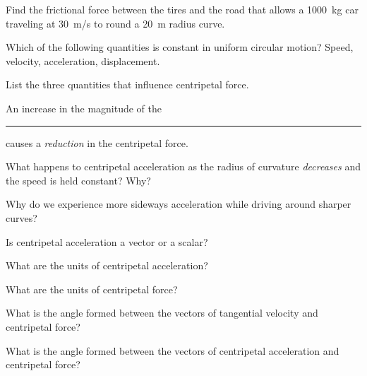 \documentclass[main-physics.tex]{subfiles}
\begin{document}
\begin{exercise} \label{MJm5VE}
    Find the frictional force between the tires and the road that allows a \SI{1000}{kg} car traveling at \SI{30}{m/s} to round a \SI{20}{m} radius curve.
\end{exercise}

\begin{exercise} \label{fsjtBV}
    Which of the following quantities is constant in uniform circular motion? Speed, velocity, acceleration, displacement.
\end{exercise}

\begin{exercise} \label{GD8Yff}
    List the three quantities that influence centripetal force.
\end{exercise}

\begin{exercise} \label{aEtlVz}
    An increase in the magnitude of the \rule{2cm}{0.15mm} causes a \textit{reduction} in the centripetal force.
\end{exercise}

\begin{exercise} \label{5lauZ6}
    What happens to centripetal acceleration as the radius of curvature \textit{decreases} and the speed is held constant? Why?
\end{exercise}

\begin{exercise} \label{KB7t4k}
    Why do we experience more sideways acceleration while driving around sharper curves?
\end{exercise}

\begin{exercise} \label{jb3iGO}
    Is centripetal acceleration a vector or a scalar?
\end{exercise}

\begin{exercise} \label{TUxTQh}
    What are the units of centripetal acceleration?
\end{exercise}

\begin{exercise} \label{9YKhPo}
    What are the units of centripetal force?
\end{exercise}

\begin{exercise} \label{wS6Htw}
    What is the angle formed between the vectors of tangential velocity and centripetal force?
\end{exercise}

\begin{exercise} \label{barV9C}
    What is the angle formed between the vectors of centripetal acceleration and centripetal force?
\end{exercise}
\end{document}
